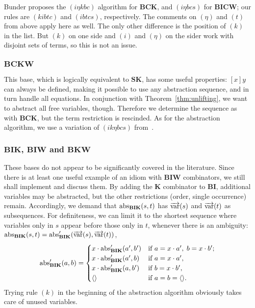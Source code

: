 Bunder proposes the $(i\eta kbc)$ algorithm for $\mathbf{BCK}$, and
$(i\eta bcs)$ for $\mathbf{BICW}$; our rules are $(kibtc)$ and $(ibtcs)$,
respectively.
The comments on $(\eta)$ and $(t)$ from above apply here as well.
The only other difference is the position of $(k)$ in the list.
But $(k)$ on one side and $(i)$ and $(\eta)$ on the sider work with disjoint
sets of terms, so this is not an issue.

\subsubsection*{$\mathbf{BCKW}$}\label{subsec:base-bckw}

This base, which is logically equivalent to $\mathbf{SK}$, has some useful
properties:
$[x]y$ can always be defined, making it possible to use any abstraction
sequence, and in turn handle all equations.
In conjunction with Theorem~\ref{thm:unlifting}, we want to abstract all
free variables, though.
Therefore we determine the sequence as with $\mathbf{BCK}$, but the
term restriction is rescinded.
As for the abstraction algorithm, we use a variation of $(ik\eta bcs)$
from~\cite{curry68}.

\subsubsection*{$\mathbf{BIK}$, $\mathbf{BIW}$ and $\mathbf{BKW}$}\label{subsec:base-odd}

These bases do not appear to be significantly covered in the literature.
Since there is at least one useful example of an idiom with $\mathbf{BIW}$
combinators, we still shall implement and discuss them.
By adding the $\mathbf{K}$ combinator to $\mathbf{BI}$, additional variables
may be abstracted, but the other restrictions (order, single occurrence) remain.
Accordingly, we demand that $\operatorname{abs}_\mathbf{BIK}(s,t)$ has $\overrightarrow{\operatorname{var}}(s)$ and
$\overrightarrow{\operatorname{var}}(t)$ as subsequences.
For definiteness, we can limit it to the shortest sequence where variables
only in $s$ appear before those only in $t$, whenever there is an ambiguity:
$\operatorname{abs}_\mathbf{BIK}(s,t) = \operatorname{abs}'_\mathbf{BIK}(\overrightarrow{\operatorname{var}}(s), \overrightarrow{\operatorname{var}}(t))$,
\[ \operatorname{abs}'_\mathbf{BIK}(a,b) = \begin{cases}
		x \cdot \operatorname{abs}'_\mathbf{BIK}(a',b') &\text{if } a = x \cdot a', \; b = x \cdot b'; \\
		x \cdot \operatorname{abs}'_\mathbf{BIK}(a',b) &\text{if } a = x \cdot a', \\
		x \cdot \operatorname{abs}'_\mathbf{BIK}(a,b') &\text{if } b = x \cdot b', \\
		\langle \rangle &\text{if } a = b = \langle \rangle. \end{cases} \]
Trying rule $(k)$ in the beginning of the abstraction algorithm obviously takes
care of unused variables.

